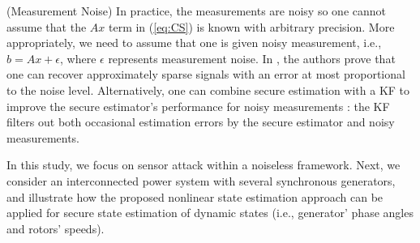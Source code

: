 \begin{remark}
(Measurement Noise) In practice, the measurements are noisy so one cannot assume that the $Ax$ term in (\ref{eq:CS}) is known with arbitrary precision. More appropriately, we need to assume that one is given noisy measurement, i.e., $b = Ax + \epsilon$, where $\epsilon$ represents measurement noise. In \cite{Candes_Tao}, the authors prove that one can recover approximately sparse signals with an error at most proportional to the noise level. Alternatively, one can combine secure estimation with a KF to improve the secure estimator's performance for noisy measurements \cite{Hu:2016uav}: the KF filters out both occasional estimation errors by the secure estimator and noisy measurements.
\end{remark}


In this study, we focus on sensor attack within a noiseless framework. Next, we consider an interconnected power system with several synchronous generators, and illustrate how the proposed nonlinear state estimation approach can be applied for secure state estimation of dynamic states (i.e., generator' phase angles and rotors' speeds).


